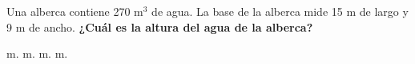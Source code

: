 Una alberca contiene 270 m$^3$ de agua.
La base de la alberca mide 15 m de largo y 9 m de ancho.
\textbf{¿Cuál es la altura del agua de la alberca?}

\begin{oneparchoices}
     m.
     m.
     m.
     m.
\end{oneparchoices}